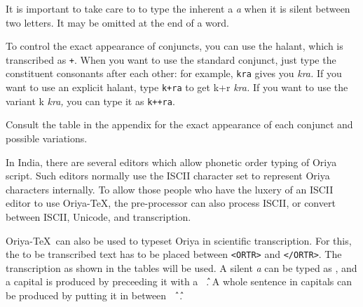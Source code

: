 \bigskip

It is important to take care to to type the inherent {\or a} {\it a\/} when it is 
silent between two letters. It may be omitted at the end of a word.

To control the exact appearance of conjuncts, you can use the
halant, which is transcribed as {\tt +}. When you want to use the
standard conjunct, just type the constituent consonants after each
other: for example, {\tt kra} gives you {\or\orkra} {\it kra.} If you want to
use an explicit halant, type {\tt k+ra} to get {\or k+r} {\it kra.} If you want
to use the variant {\or k\orsecra} {\it kra,} you can type it as {\tt k++ra}.

Consult the table in the appendix for the exact appearance of each conjunct and
possible variations.

In India,
there are several editors which allow phonetic order typing of Oriya script. Such editors
normally use the ISCII character set to represent Oriya characters internally.
To allow those people who have the luxery of an
ISCII editor to use Oriya-\TeX, the pre-processor can also process ISCII, or
convert between ISCII, Unicode, and transcription.

Oriya-\TeX\ can also be used to typeset Oriya in scientific transcription.
For this, the to be transcribed text has to be placed between {\tt<ORTR>} and
{\tt </ORTR>}. The transcription as shown in the tables will be used. A silent
{\it a\/} can be typed as {\tt *}, and a capital is produced by preceeding it
with a {\tt \^\ }. A whole sentence in capitals can be produced by putting it
in between {\tt \^\ \^\ }.






